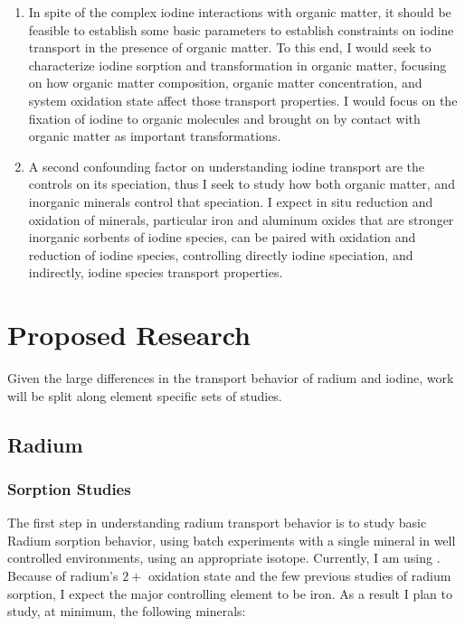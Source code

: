 \documentclass[twoside,12pt,titlepage]{article}
\newcommand{\isotope}[2]{\ch{^{#1}#2}}
\begin{document}
\begin{enumerate}[label = \arabic*)]
	\item In spite of the complex iodine interactions with organic matter, it should be feasible to establish some basic parameters to establish constraints on iodine transport in the presence of organic matter. To this end, I would seek to characterize iodine sorption and transformation in organic matter, focusing on how organic matter composition, organic matter concentration, and system oxidation state affect those transport properties. I would focus on the fixation of iodine to organic molecules and brought on by contact with organic matter as important transformations.
	\item A second confounding factor on understanding iodine transport are the controls on its speciation, thus I seek to study how both organic matter, and inorganic minerals control that speciation. I expect in situ reduction and oxidation of minerals, particular iron and aluminum oxides that are stronger inorganic sorbents of iodine species, can be paired with oxidation and reduction of iodine species, controlling directly iodine speciation, and indirectly, iodine species transport properties.
\end{enumerate}



\section{Proposed Research}

Given the large differences in the transport behavior of radium and iodine, work will be split along element specific sets of studies.

\subsection{Radium}

\subsubsection{Sorption Studies}
The first step in understanding radium transport behavior is to study basic Radium sorption behavior, using batch experiments with a single mineral in well controlled environments, using an appropriate isotope. Currently, I am using \isotope{226}{Ra}. Because of radium's $2+$ oxidation state and the few previous studies of radium sorption, I expect the major controlling element to be iron. As a result I plan to study, at minimum, the following minerals:
\end{document}
